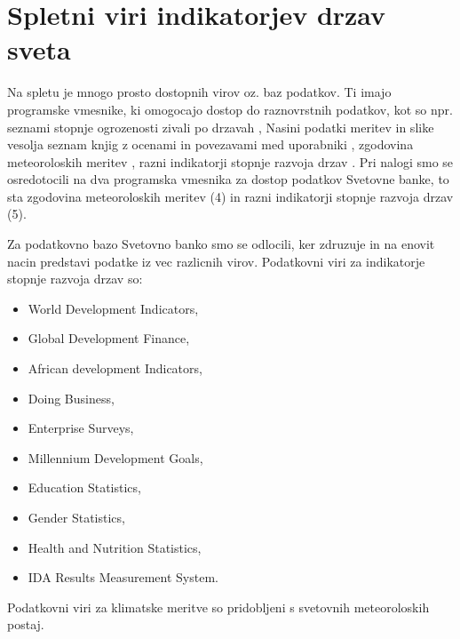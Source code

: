 \chapter{Spletni viri indikatorjev drzav sveta}

Na spletu je mnogo prosto dostopnih virov oz. baz podatkov. Ti imajo programske
vmesnike, ki omogocajo dostop do raznovrstnih podatkov, kot so npr. seznami 
stopnje ogrozenosti zivali po drzavah 
,
Nasini podatki meritev in slike vesolja
seznam knjig z ocenami in povezavami med uporabniki
,
zgodovina meteoroloskih meritev
,
razni indikatorji stopnje razvoja drzav
.
Pri nalogi smo se osredotocili na dva programska vmesnika za dostop podatkov 
Svetovne banke, to sta zgodovina meteoroloskih meritev (4) in razni 
indikatorji stopnje razvoja drzav (5).


% 
% 
% 
% 


Za podatkovno bazo Svetovno banko smo se odlocili, ker zdruzuje in na enovit
nacin predstavi podatke iz vec razlicnih virov. Podatkovni viri za indikatorje
stopnje razvoja drzav so:

\begin{itemize}  
\item World Development Indicators, 
\item Global Development Finance, 
\item African development Indicators, 
\item Doing Business,
\item Enterprise Surveys, 
\item Millennium Development Goals, 
\item Education Statistics, 
\item Gender Statistics,
\item Health and Nutrition Statistics, 
\item IDA Results Measurement System.
\end{itemize}  

Podatkovni viri za klimatske meritve so pridobljeni s svetovnih meteoroloskih 
postaj.


